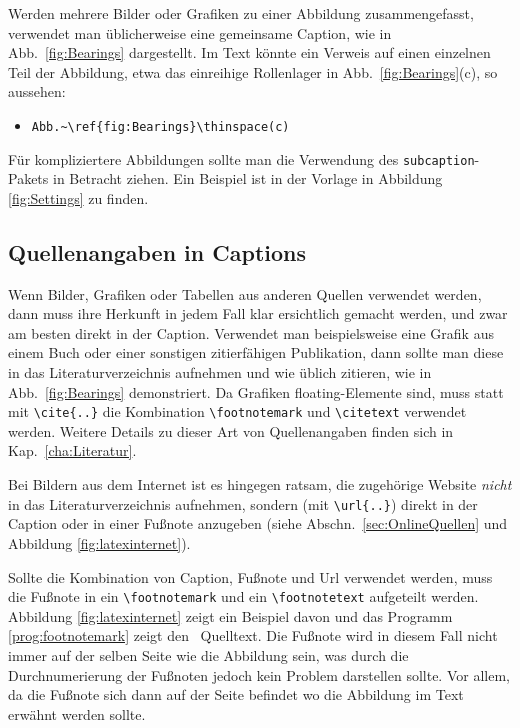 Werden mehrere Bilder oder Grafiken zu einer Abbildung zusammengefasst, 
verwendet man üblicherweise eine gemeinsame Caption, wie in Abb.~\ref{fig:Bearings}
dargestellt. Im Text könnte ein Verweis auf einen einzelnen Teil der Abbildung, etwa das 
einreihige Rollenlager in Abb.~\ref{fig:Bearings}\thinspace(c), so aussehen:
%
\begin{itemize}
\item[] \verb!Abb.~\ref{fig:Bearings}\thinspace(c)! 
\end{itemize}
%
Für kompliziertere Abbildungen sollte man die Verwendung des 
\texttt{subcaption}-Pakets \cite{Cochran95} in Betracht ziehen. Ein Beispiel ist in der Vorlage in Abbildung \ref{fig:Settings} zu finden.


\subsection{Quellenangaben in Captions}
\label{sec:QuellenangabenInCaptions}

Wenn Bilder, Grafiken oder Tabellen aus anderen Quellen verwendet werden, dann muss ihre Herkunft in jedem Fall klar ersichtlich gemacht werden, und zwar am besten direkt in der Caption.
Verwendet man beispielsweise eine Grafik aus einem Buch oder einer sonstigen zitierfähigen Publikation, dann sollte man diese in das Literaturverzeichnis aufnehmen und wie üblich zitieren, wie in Abb.\ \ref{fig:Bearings} demonstriert. Da Grafiken floating-Elemente sind, muss statt mit
\verb!\cite{..}! die Kombination \verb!\footnotemark! und \verb!\citetext! verwendet werden. Weitere Details zu dieser Art von Quellenangaben finden sich in Kap.\ \ref{cha:Literatur}.

Bei Bildern aus dem Internet ist es hingegen ratsam, die zugehörige Website \emph{nicht} in das Literaturverzeichnis aufnehmen, sondern (mit \verb!\url{..}!) direkt in der Caption oder in einer Fußnote anzugeben (siehe Abschn.\ \ref{sec:OnlineQuellen} und Abbildung \ref{fig:latexinternet}). 

Sollte die Kombination von Caption, Fußnote und Url verwendet werden, muss die Fußnote in ein \verb!\footnotemark! und ein \verb!\footnotetext! aufgeteilt werden. Abbildung \ref{fig:latexinternet} zeigt ein Beispiel davon und das Programm \ref{prog:footnotemark} zeigt den \latex\ Quelltext. Die Fußnote wird in diesem Fall nicht immer auf der selben Seite wie die Abbildung sein, was durch die Durchnumerierung der Fußnoten jedoch kein Problem darstellen sollte. Vor allem, da die Fußnote sich dann auf der Seite befindet wo die Abbildung im Text erwähnt werden sollte. 

